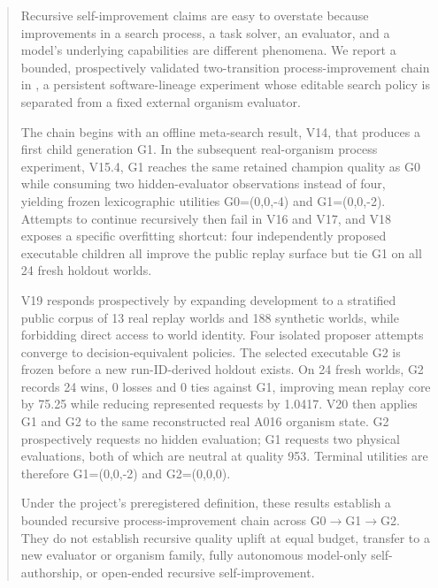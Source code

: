 \maketitle

\begin{abstract}
Recursive self-improvement claims are easy to overstate because improvements in a search process, a task solver, an evaluator, and a model's underlying capabilities are different phenomena. We report a bounded, prospectively validated two-transition process-improvement chain in \genesis, a persistent software-lineage experiment whose editable search policy is separated from a fixed external organism evaluator.

The chain begins with an offline meta-search result, V14, that produces a first child generation G1. In the subsequent real-organism process experiment, V15.4, G1 reaches the same retained champion quality as G0 while consuming two hidden-evaluator observations instead of four, yielding frozen lexicographic utilities G0=(0,0,-4) and G1=(0,0,-2). Attempts to continue recursively then fail in V16 and V17, and V18 exposes a specific overfitting shortcut: four independently proposed executable children all improve the public replay surface but tie G1 on all 24 fresh holdout worlds.

V19 responds prospectively by expanding development to a stratified public corpus of 13 real replay worlds and 188 synthetic worlds, while forbidding direct access to world identity. Four isolated proposer attempts converge to decision-equivalent policies. The selected executable G2 is frozen before a new run-ID-derived holdout exists. On 24 fresh worlds, G2 records 24 wins, 0 losses and 0 ties against G1, improving mean replay core by 75.25 while reducing represented requests by 1.0417. V20 then applies G1 and G2 to the same reconstructed real A016 organism state. G2 prospectively requests no hidden evaluation; G1 requests two physical evaluations, both of which are neutral at quality 953. Terminal utilities are therefore G1=(0,0,-2) and G2=(0,0,0).

Under the project's preregistered definition, these results establish a bounded \lthreep recursive process-improvement chain across G0$\rightarrow$G1$\rightarrow$G2. They do not establish recursive quality uplift at equal budget, transfer to a new evaluator or organism family, fully autonomous model-only self-authorship, or open-ended recursive self-improvement.
\end{abstract}

